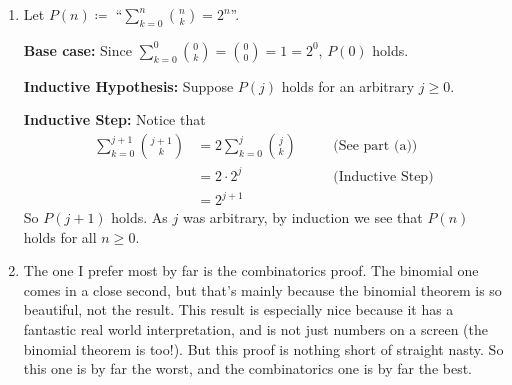 \documentclass[12pt]{article}
\theoremstyle{definition}
\theoremstyle{remark}
\newcommand{\justif}[1]{&\quad &\text{(#1)}}
\begin{document}
\begin{enumerate}[leftmargin=\labelsep]
\begin{enumerate}
			\item Let $P(n) \coloneqq $ ``$\sum_{k=0}^n {n \choose k} = 2^n$''. 
			
			\textbf{Base case:} Since $\sum_{k=0}^0 {0 \choose k} = {0 \choose 0} = 1 = 2^0$, $P(0)$ holds.
			
			\textbf{Inductive Hypothesis:} Suppose $P(j)$ holds for an arbitrary $j \geq 0$.
			
			\textbf{Inductive Step:} Notice that 
			\begin{align*}
				\sum_{k=0}^{j+1} {j+1 \choose k} &= 2 \sum_{k=0}^j {j \choose k} \justif{See part (a)} \\
				&= 2 \cdot 2^j \justif{Inductive Step} \\
				&= 2^{j+1}
			\end{align*}
			So $P(j+1)$ holds. As $j$ was arbitrary, by induction we see that $P(n)$ holds for all $n \geq 0$.
			
			\item The one I prefer most by far is the combinatorics proof. The binomial one comes in a close second, but that's mainly because the binomial theorem is so beautiful, not the result. This result is especially nice because it has a fantastic real world interpretation, and is not just numbers on a screen (the binomial theorem is too!). But this proof is nothing short of straight nasty. So this one is by far the worst, and the combinatorics one is by far the best.
		\end{enumerate}
	\end{enumerate}
\end{document}
